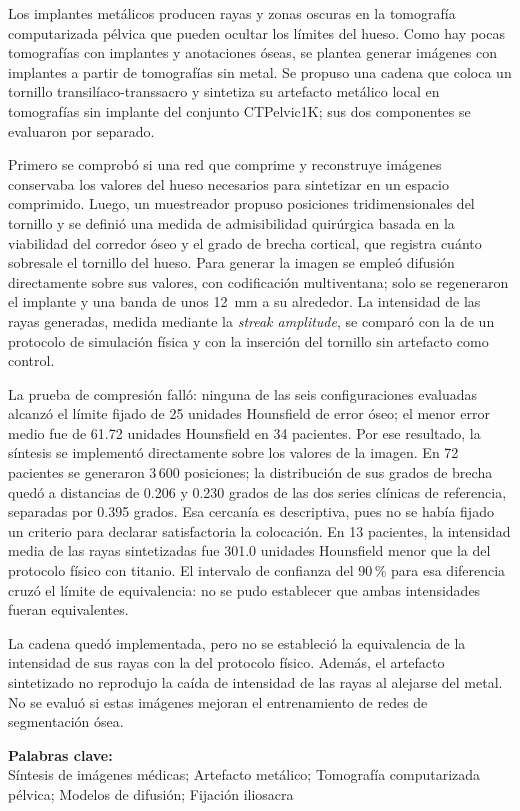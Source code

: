 
Los implantes metálicos producen rayas y zonas oscuras en la tomografía computarizada pélvica que pueden ocultar los límites del hueso. Como hay pocas tomografías con implantes y anotaciones óseas, se plantea generar imágenes con implantes a partir de tomografías sin metal. Se propuso una cadena que coloca un tornillo transilíaco-transsacro y sintetiza su artefacto metálico local en tomografías sin implante del conjunto CTPelvic1K; sus dos componentes se evaluaron por separado.

Primero se comprobó si una red que comprime y reconstruye imágenes conservaba los valores del hueso necesarios para sintetizar en un espacio comprimido. Luego, un muestreador propuso posiciones tridimensionales del tornillo y se definió una medida de admisibilidad quirúrgica basada en la viabilidad del corredor óseo y el grado de brecha cortical, que registra cuánto sobresale el tornillo del hueso. Para generar la imagen se empleó difusión directamente sobre sus valores, con codificación multiventana; solo se regeneraron el implante y una banda de unos 12~mm a su alrededor. La intensidad de las rayas generadas, medida mediante la \emph{streak amplitude}, se comparó con la de un protocolo de simulación física y con la inserción del tornillo sin artefacto como control.

La prueba de compresión falló: ninguna de las seis configuraciones evaluadas alcanzó el límite fijado de 25 unidades Hounsfield de error óseo; el menor error medio fue de 61.72 unidades Hounsfield en 34 pacientes. Por ese resultado, la síntesis se implementó directamente sobre los valores de la imagen. En 72 pacientes se generaron 3\,600 posiciones; la distribución de sus grados de brecha quedó a distancias de 0.206 y 0.230 grados de las dos series clínicas de referencia, separadas por 0.395 grados. Esa cercanía es descriptiva, pues no se había fijado un criterio para declarar satisfactoria la colocación. En 13 pacientes, la intensidad media de las rayas sintetizadas fue 301.0 unidades Hounsfield menor que la del protocolo físico con titanio. El intervalo de confianza del 90\,\% para esa diferencia cruzó el límite de equivalencia: no se pudo establecer que ambas intensidades fueran equivalentes.

La cadena quedó implementada, pero no se estableció la equivalencia de la intensidad de sus rayas con la del protocolo físico.  Además, el artefacto sintetizado no reprodujo la caída de intensidad de las rayas al alejarse del metal. No se evaluó si estas imágenes mejoran el entrenamiento de redes de segmentación ósea.

\noindent \textbf{Palabras clave:}\\
\noindent Síntesis de imágenes médicas; Artefacto metálico; Tomografía computarizada pélvica; Modelos de difusión; Fijación iliosacra
